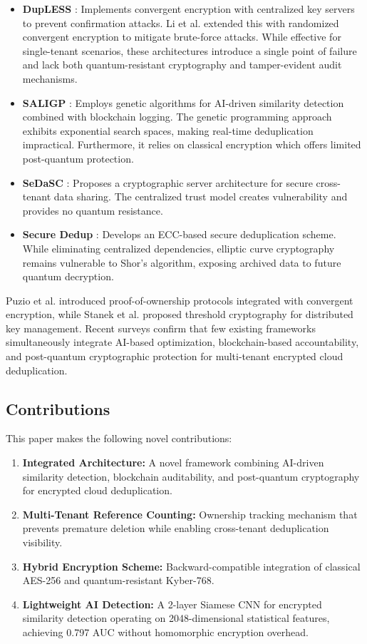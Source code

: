 \documentclass[conference]{IEEEtran}
\begin{document}
\begin{itemize}
    \item \textbf{DupLESS} \cite{r6}: Implements convergent encryption with centralized key servers to prevent confirmation attacks. Li et al. \cite{r10} extended this with randomized convergent encryption to mitigate brute-force attacks. While effective for single-tenant scenarios, these architectures introduce a single point of failure and lack both quantum-resistant cryptography and tamper-evident audit mechanisms.
    \item \textbf{SALIGP} \cite{r7}: Employs genetic algorithms for AI-driven similarity detection combined with blockchain logging. The genetic programming approach exhibits exponential search spaces, making real-time deduplication impractical. Furthermore, it relies on classical encryption which offers limited post-quantum protection.
    \item \textbf{SeDaSC} \cite{r8}: Proposes a cryptographic server architecture for secure cross-tenant data sharing. The centralized trust model creates vulnerability and provides no quantum resistance.
    \item \textbf{Secure Dedup} \cite{r9}: Develops an ECC-based secure deduplication scheme. While eliminating centralized dependencies, elliptic curve cryptography remains vulnerable to Shor's algorithm, exposing archived data to future quantum decryption.
\end{itemize}

Puzio et al. \cite{r11} introduced proof-of-ownership protocols integrated with convergent encryption, while Stanek et al. \cite{r12} proposed threshold cryptography for distributed key management. Recent surveys confirm that few existing frameworks simultaneously integrate AI-based optimization, blockchain-based accountability, and post-quantum cryptographic protection for multi-tenant encrypted cloud deduplication.

\subsection{Contributions}
This paper makes the following novel contributions:
\begin{enumerate}
    \item \textbf{Integrated Architecture:} A novel framework combining AI-driven similarity detection, blockchain auditability, and post-quantum cryptography for encrypted cloud deduplication.
    \item \textbf{Multi-Tenant Reference Counting:} Ownership tracking mechanism that prevents premature deletion while enabling cross-tenant deduplication visibility.
    \item \textbf{Hybrid Encryption Scheme:} Backward-compatible integration of classical AES-256 and quantum-resistant Kyber-768.
    \item \textbf{Lightweight AI Detection:} A 2-layer Siamese CNN for encrypted similarity detection operating on 2048-dimensional statistical features, achieving 0.797 AUC without homomorphic encryption overhead.
\end{enumerate}
\end{document}
